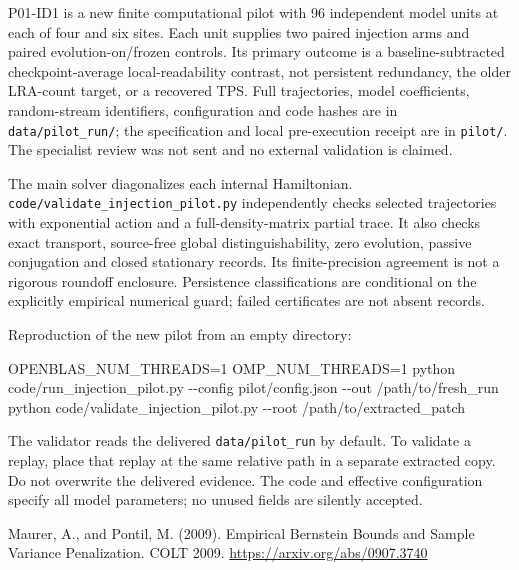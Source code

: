 \documentclass[
  10pt,
  a4paper,
]{article}
\makeatletter
\newenvironment{Shaded}{}{}
\newcommand{\NormalTok}[1]{#1}
\renewcommand\subsection{\@startsection{subsection}{2}{\z@}{-2ex \@plus -.8ex \@minus -.2ex}{.9ex \@plus .2ex}{\normalfont\large\bfseries}}
\makeatother
\begin{document}
P01-ID1 is a new finite computational pilot with 96 independent model
units at each of four and six sites. Each unit supplies two paired
injection arms and paired evolution-on/frozen controls. Its primary
outcome is a baseline-subtracted checkpoint-average local-readability
contrast, not persistent redundancy, the older LRA-count target, or a
recovered TPS. Full trajectories, model coefficients, random-stream
identifiers, configuration and code hashes are in
\nolinkurl{data/pilot_run/}; the specification and local pre-execution
receipt are in \nolinkurl{pilot/}. The specialist review was not sent
and no external validation is claimed.

The main solver diagonalizes each internal Hamiltonian.
\nolinkurl{code/validate_injection_pilot.py} independently checks
selected trajectories with exponential action and a full-density-matrix
partial trace. It also checks exact transport, source-free global
distinguishability, zero evolution, passive conjugation and closed
stationary records. Its finite-precision agreement is not a rigorous
roundoff enclosure. Persistence classifications are conditional on the
explicitly empirical numerical guard; failed certificates are not absent
records.

Reproduction of the new pilot from an empty directory:

\begin{Shaded}
\begin{Highlighting}[]
\NormalTok{OPENBLAS\_NUM\_THREADS=1 OMP\_NUM\_THREADS=1 python code/run\_injection\_pilot.py {-}{-}config pilot/config.json {-}{-}out /path/to/fresh\_run}
\NormalTok{python code/validate\_injection\_pilot.py {-}{-}root /path/to/extracted\_patch}
\end{Highlighting}
\end{Shaded}

The validator reads the delivered \nolinkurl{data/pilot_run} by default.
To validate a replay, place that replay at the same relative path in a
separate extracted copy. Do not overwrite the delivered evidence. The
code and effective configuration specify all model parameters; no unused
fields are silently accepted.

\subsection{References}\label{references}

Maurer, A., and Pontil, M. (2009). Empirical Bernstein Bounds and Sample
Variance Penalization. COLT 2009. \url{https://arxiv.org/abs/0907.3740}
\end{document}

